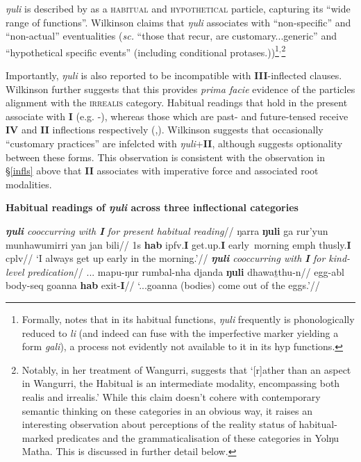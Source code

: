 \textit{ŋuli} is described by \citet[347]{Wilkinson1991} as a \textsc{habitual} and \textsc{hypothetical} particle, capturing its ``wide range of functions''. Wilkinson claims that \textit{ŋuli} associates with ``non-specific'' and ``non-actual'' eventualities (\textit{sc.}  ``those that recur, are customary...generic'' and ``hypothetical specific events'' (including conditional protases.))\footnote{Formally, \citet[348]{Wilkinson1991} notes that in its habitual functions, \textit{ŋuli} frequently is phonologically reduced to \textit{li} (and indeed can fuse with the imperfective marker yielding a form \textit{ga\textdblhyphen li}), a process not evidently not available to it in its \gls{hyp} functions.}$^,$\footnote{Notably, in her treatment of Wangurri, \citet[156]{McLellan1992} suggests that `[r]ather than an aspect in Wangurri, the Habitual is an intermediate modality, encompassing both realis and irrealis.' While this claim doesn't cohere with contemporary semantic thinking on these categories in an obvious way, it raises an interesting observation about perceptions of the reality status of habitual-marked predicates and the grammaticalisation of these categories in Yolŋu Matha. This is discussed in further detail below.}

Importantly, \textit{ŋuli} is also reported to be incompatible with \textbf{III}-inflected clauses. Wilkinson further suggests that this provides \textit{prima facie} evidence of the particles alignment with the \textsc{irrealis} category. Habitual readings that hold in the present associate with \textbf{I} (e.g. -), whereas those which are past- and future-tensed receive \textbf{IV} and \textbf{II} inflections respectively (,). Wilkinson suggests that occasionally ``customary practices'' are infelcted with \textit{ŋuli}+\textbf{II}, although suggests optionality between these forms. This observation is consistent with the observation in §\ref{infls} above that \textbf{II} associates with imperative force and associated root modalities.

\pex \textbf{Habitual readings of \textit{ŋuli} across three inflectional categories}

\a{}\begingl\glpreamble \textit{\textbf{ŋuli} cooccurring with \textbf{I} for present habitual reading}//
\gla ŋarra \textbf{ŋuli} ga rur'yun munhawumirri yan jan bili//
\glb 1s \textbf{\gls{hab}} \gls{ipfv}.\textbf{I} get.up.\textbf{I} early~morning \gls{emph} thusly.\textbf{I} \gls{cplv}//
\glft`I always get up early in the morning.'//\endgl
\a{}\begingl\glpreamble\textit{\textbf{ŋuli} cooccurring with \textbf{I} for kind-level predication}//
\gla... mapu-ŋur rumbal-nha djanda \textbf{ŋuli} dhawaṯthu-n//
\glb {} egg-\gls{abl} body-\gls{seq} goanna \textbf{\gls{hab}} exit-\textbf{I}//
\glft`...goanna (bodies) come out of the eggs.'//\endgl

